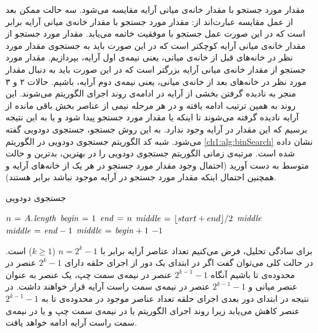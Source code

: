 {مقدار مورد جستجو با مقدار خانه‌ی میانی آرایه مقایسه می‌شود. سه حالت ممکن بعد از عمل مقایسه عبارت‌اند از:
 مقدار مورد جستجو با مقدار خانه‌ی میانی آرایه برابر است که در این صورت عمل جستجو با موفقیت خاتمه می‌یابد.
 مقدار مورد جستجو از مقدار خانه‌ی میانی آرایه کوچکتر است که در این صورت باید به جستجوی مقدار مورد نظر در خانه‌های قبل از خانه‌ی میانی، یعنی نیمه‌ی اول آرایه، بپردازیم.
 مقدار مورد جستجو از مقدار خانه‌ی میانی آرایه بزرگتر است که در این صورت باید به دنبال مقدار مورد نظر در خانه‌های بعد از خانه‌ی میانی، یعنی نیمه‌ی دوم آرایه، باشیم. 
حالات ۲ و ۳ منجر به نادیده گرفتن بخشی از آرایه در ادامه‌ی روند اجرای الگوریتم می‌شوند. این روند به همین ترتیب ادامه یافته و در هر مرحله نیمی از عناصر بخش باقی مانده از آرایه نادیده گرفته می‌شوند تا اینکه یا مقدار مورد جستجو پیدا شود و یا به این نتیجه برسیم که این مقدار در آرایه وجود ندارد. به این روش جستجو، جستجوی دودویی گفته می‌شود. شبه کد الگوریتم جستجوی دودویی در الگوریتم {\eqref{ch1:alg:binSearch}} نشان داده شده است. مرتبه‌ی زمانی الگوریتم جستجوی دودویی را در بهترین، بدترین و حالت متوسط به دست آورید (احتمال وجود مقدار مورد جستجو در هر یک از خانه‌های آرایه و همچنین احتمال اینکه مقدار مورد جستجو در آرایه موجود نباشد برابر هستند).

\begin{algorithm}
\caption{جستجوی دودویی}\label{ch1:alg:binSearch}
\begin{latin}
\begin{algorithmic}[1]
		\State	$n \mathrel{\hspace{1pt}=\hspace{1pt}} A.\hspace*{1pt}\mathit{length}$
		\State	$\mathit{begin} \mathrel{\hspace{1pt}=\hspace{1pt}} 1$
		\State	$\mathit{end} \mathrel{\hspace{1pt}=\hspace{1pt}} n$
				\State	$ \mathit{middle} \mathrel{\hspace{1pt}=\hspace{1pt}} \lfloor start+end \rfloor / 2 $
						\State	\Return $\mathit{middle}$
						\State	$\mathit{middle} \mathrel{\hspace{1pt}=\hspace{1pt}} \mathit{end} - 1$
				\Else	
					 	\State	$\mathit{middle} \mathrel{\hspace{1pt}=\hspace{1pt}} \mathit{begin} + 1$	
				\EndIf
		\EndWhile
		\State	\Return	$-1$
\EndFunction
\end{algorithmic}
\end{latin}
\end{algorithm}


برای سادگی تحلیل، فرض می‌کنیم تعداد عناصر آرایه برابر با {$n=2^{k}-1$} ({$k\geqslant 1$}) است. در حالت کلی می‌توان گفت اگر در ابتدای یک دور از اجرای حلقه دارای {$2^{k}-1$} عنصر در محدوده‌ی {} تا {} باشیم آنگاه {$2^{k-1}-1$} عنصر در نیمه‌ی سمت چپ، یک عنصر به عنوان عنصر میانی و {$2^{k-1}-1$} عنصر در نیمه‌ی سمت راست آرایه قرار خواهند داشت. در نتیجه در ابتدای دور بعدی اجرای حلقه تعداد عناصر موجود در محدوده‌ی {} تا {} به {$2^{k-1}-1$} عنصر کاهش می‌یابد زیرا روند اجرای الگوریتم یا در نیمه‌ی سمت چپ و یا در نیمه‌ی سمت راست آرایه ادامه خواهد یافت.

}
